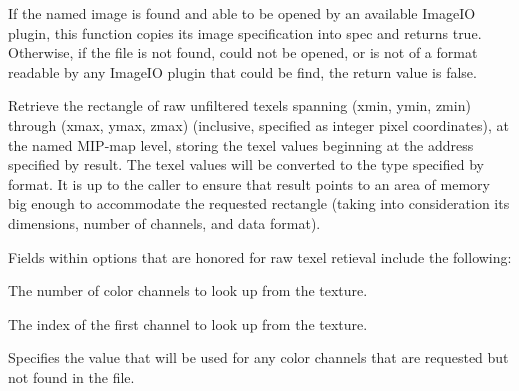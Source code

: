 
If the named image is found and able to be opened by an available
ImageIO plugin, this function copies its image specification into
{\cf spec} and returns {\cf true}.  Otherwise, if the file is not
found, could not be opened, or is not of a format readable by any
ImageIO plugin that could be find, the return value is {\cf false}.
\apiend



Retrieve the rectangle of raw unfiltered texels spanning
(xmin, ymin, zmin) through (xmax, ymax, zmax) (inclusive, specified as
integer pixel coordinates), at the named MIP-map level, storing
the texel values beginning at the address specified by result.
The texel values will be converted to the type specified by
format.  It is up to the caller to ensure that result points to
an area of memory big enough to accommodate the requested
rectangle (taking into consideration its dimensions, number of
channels, and data format).

Fields within {\cf options} that are honored for raw texel retieval
include the following:

\vspace{-12pt}
\vspace{10pt}
The number of color channels to look up from the texture.
\apiend

\vspace{-24pt}
\vspace{10pt}
The index of the first channel to look up from the texture.
\apiend


\vspace{-24pt}
\vspace{10pt}
Specifies the value that will be used for any color channels that are
requested but not found in the file.
\apiend

